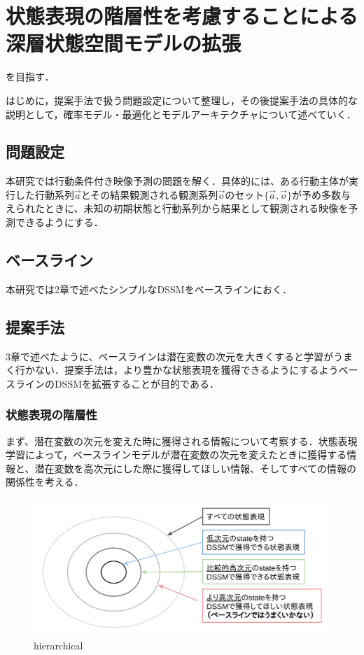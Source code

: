 \chapter{状態表現の階層性を考慮することによる深層状態空間モデルの拡張}
\label{chap:proposal}
を目指す．

はじめに，提案手法で扱う問題設定について整理し，その後提案手法の具体的な説明として，確率モデル・最適化とモデルアーキテクチャについて述べていく．

\section{問題設定}
本研究では行動条件付き映像予測の問題を解く．具体的には、ある行動主体が実行した行動系列$\vec{a}$とその結果観測される観測系列$\vec{o}$のセット$\{\vec{a}, \vec{o}\}$が予め多数与えられたときに、未知の初期状態と行動系列から結果として観測される映像を予測できるようにする．

\section{ベースライン}
本研究では2章で述べたシンプルなDSSMをベースラインにおく．

\section{提案手法}
3章で述べたように、ベースラインは潜在変数の次元を大きくすると学習がうまく行かない．提案手法は，より豊かな状態表現を獲得できるようにするようベースラインのDSSMを拡張することが目的である．

\subsection{状態表現の階層性}
まず、潜在変数の次元を変えた時に獲得される情報について考察する．状態表現学習によって，ベースラインモデルが潜在変数の次元を変えたときに獲得する情報と、潜在変数を高次元にした際に獲得してほしい情報、そしてすべての情報の関係性を考える．

\begin{figure}[tbp]
  \begin{center}
    \includegraphics[width=\linewidth]{./figures/hierarchical.png}
    \caption{hierarchical}
    \label{fig:hierarchical}
  \end{center}
\end{figure}


